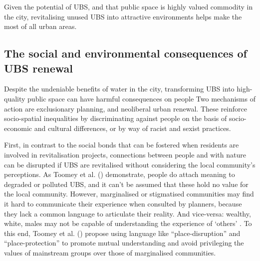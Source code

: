 \documentclass{article}
\begin{document}
Given the potential of UBS, and that public space is highly valued commodity in the city, revitalising unused UBS into attractive environments helps make the most of all urban areas.
 
\subsection{The social and environmental consequences of UBS renewal}

Despite the undeniable benefits of water in the city, transforming UBS into high-quality public space can have harmful consequences on people
Two mechanisms of action are exclusionary planning, and neoliberal urban renewal. These reinforce socio-spatial inequalities by discriminating against people on the basis of socio-economic and cultural differences, or by way of racist and sexist practices.

First, in contrast to the social bonds that can be fostered when residents are involved in revitalisation projects, connections between people and with nature can be disrupted if UBS are revitalised without considering the local community's perceptions. As Toomey et al. (\citeyear{toomey2021place}) demonstrate, people do attach meaning to degraded or polluted UBS, and it can't be assumed that these hold no value for the local community. 
However, marginalised or stigmatised communities may find it hard to communicate their experience when consulted by planners, because they lack a common language to articulate their reality. And vice-versa: wealthy, white, males may not be capable of understanding the experience of `others' \parencite{anguelovski2020expanding}. To this end, Toomey et al. (\citeyear{toomey2021place}) propose using language like ``place-disruption'' and ``place-protection'' to promote mutual understanding and avoid privileging the values of mainstream groups over those of marginalised communities.
\end{document}
